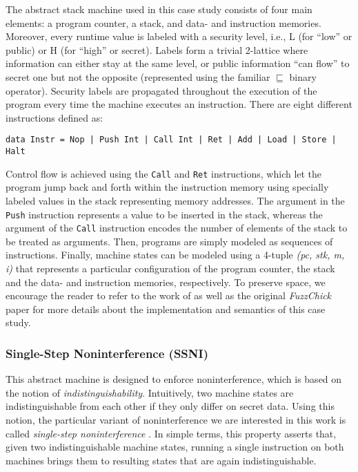 \documentclass[acmsmall, anonymous]{acmart}
\newcommand{\fuzzchick}{\textit{FuzzChick}\xspace}
\begin{document}
The abstract stack machine used in this case study consists of four main
elements: a program counter, a stack, and data- and instruction memories.
%
Moreover, every runtime value is labeled with a security level, i.e., L (for
``low'' or public) or H (for ``high'' or secret).
%
Labels form a trivial 2-lattice where information can either stay at the same
level, or public information ``can flow'' to secret one but not the opposite
(represented using the familiar $\sqsubseteq$ binary operator).
%
Security labels are propagated throughout the execution of the program every
time the machine executes an instruction.
%
There are eight different instructions defined as:
%
\begin{verbatim}
data Instr = Nop | Push Int | Call Int | Ret | Add | Load | Store | Halt
\end{verbatim}

\noindent Control flow is achieved using the \texttt{Call} and \texttt{Ret}
instructions, which let the program jump back and forth within the instruction
memory using specially labeled values in the stack representing memory
addresses.
%
The argument in the \texttt{Push} instruction represents a value to be
inserted in the stack, whereas the argument of the \texttt{Call} instruction
encodes the number of elements of the stack to be treated as arguments.
%
Then, programs are simply modeled as sequences of instructions.
%
Finally, machine states can be modeled using a 4-tuple \textit{(pc, stk, m, i)}
that represents a particular configuration of the program counter, the stack and
the data- and instruction memories, respectively.
%
To preserve space, we encourage the reader to refer to the work of
\citeauthor{hritcu2013testing} \citeyearpar{hritcu2013testing,
  hrictcu2016testing} as well as the original \fuzzchick paper for more details
about the implementation and semantics of this case study.

\subsubsection{Single-Step Noninterference (SSNI)}

This abstract machine is designed to enforce noninterference, which is based on
the notion of \emph{indistinguishability}.
%
Intuitively, two machine states are indistinguishable from each other if they
only differ on secret data.
%
Using this notion, the particular variant of noninterference we are interested
in this work is called \emph{single-step noninterference}
\cite{hritcu2013testing}.
%
In simple terms, this property asserts that, given two indistinguishable machine
states, running a single instruction on both machines brings them to resulting
states that are again indistinguishable.
\end{document}
